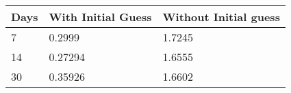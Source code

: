 \begin{tabular}{lll}
Days & With Initial Guess & Without Initial guess \\ 
\hline 
7 & 0.2999 & 1.7245 \\ 
14 & 0.27294 & 1.6555 \\ 
30 & 0.35926 & 1.6602 \\ 
\hline 
\end{tabular}